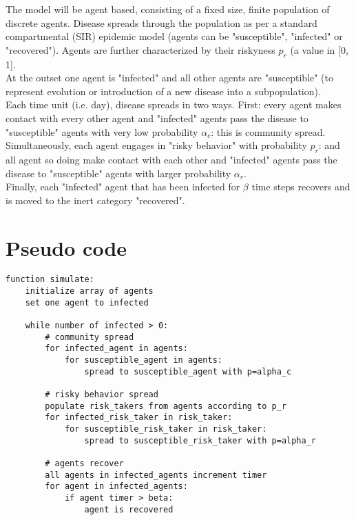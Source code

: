 \documentclass{article}
\begin{document}
The model will be agent based, consisting of a fixed size, finite population
of discrete agents.  Disease spreads through the population as per a standard
compartmental (SIR) epidemic model (agents can be "susceptible",
"infected" or "recovered"). Agents are further characterized by their
riskyness $p_r$ (a value in [0, 1].\\

At the outset one agent is "infected" and all other agents are "susceptible"
(to represent evolution or introduction of a new disease into a subpopulation).\\

Each time unit (i.e. day), disease spreads in two ways.
First: every agent makes contact with
every other agent and "infected" agents pass the disease to "susceptible"
agents with very low probability $\alpha_c$: this is community spread.\\

Simultaneously, each agent engages in "risky behavior" with probability $p_r$:
and all agent so doing make contact with each other and "infected" agents pass
the disease to "susceptible" agents with larger probability $\alpha_r$.\\

Finally, each "infected" agent that has been infected for $\beta$ time steps
recovers and is moved to the inert category "recovered".\\


\section{Pseudo code}


\begin{Verbatim}
function simulate:
	initialize array of agents
	set one agent to infected

	while number of infected > 0:
		# community spread
		for infected_agent in agents:
			for susceptible_agent in agents:
				spread to susceptible_agent with p=alpha_c

		# risky behavior spread
		populate risk_takers from agents according to p_r
		for infected_risk_taker in risk_taker:
			for susceptible_risk_taker in risk_taker:
				spread to susceptible_risk_taker with p=alpha_r

		# agents recover
		all agents in infected_agents increment timer
		for agent in infected_agents:
			if agent timer > beta:
				agent is recovered
\end{Verbatim}
\end{document}
